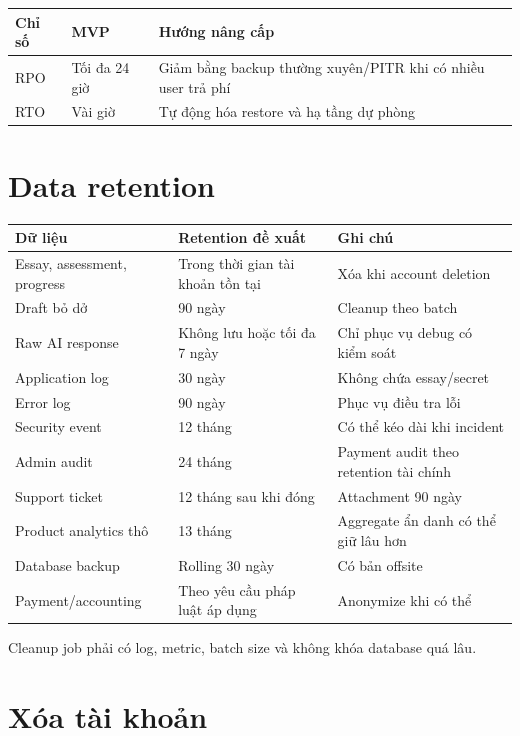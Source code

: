\documentclass[11pt,a4paper]{article}
\begin{document}
\begin{longtable}{L{0.22\textwidth}L{0.25\textwidth}L{0.45\textwidth}}
\toprule
\textbf{Chỉ số} & \textbf{MVP} & \textbf{Hướng nâng cấp} \\
\midrule
RPO & Tối đa 24 giờ & Giảm bằng backup thường xuyên/PITR khi có nhiều user trả phí \\
RTO & Vài giờ & Tự động hóa restore và hạ tầng dự phòng \\
\bottomrule
\end{longtable}

\section{Data retention}

\begin{longtable}{L{0.43\textwidth}L{0.24\textwidth}L{0.25\textwidth}}
\toprule
\textbf{Dữ liệu} & \textbf{Retention đề xuất} & \textbf{Ghi chú} \\
\midrule
Essay, assessment, progress & Trong thời gian tài khoản tồn tại & Xóa khi account deletion \\
Draft bỏ dở & 90 ngày & Cleanup theo batch \\
Raw AI response & Không lưu hoặc tối đa 7 ngày & Chỉ phục vụ debug có kiểm soát \\
Application log & 30 ngày & Không chứa essay/secret \\
Error log & 90 ngày & Phục vụ điều tra lỗi \\
Security event & 12 tháng & Có thể kéo dài khi incident \\
Admin audit & 24 tháng & Payment audit theo retention tài chính \\
Support ticket & 12 tháng sau khi đóng & Attachment 90 ngày \\
Product analytics thô & 13 tháng & Aggregate ẩn danh có thể giữ lâu hơn \\
Database backup & Rolling 30 ngày & Có bản offsite \\
Payment/accounting & Theo yêu cầu pháp luật áp dụng & Anonymize khi có thể \\
\bottomrule
\end{longtable}

Cleanup job phải có log, metric, batch size và không khóa database quá lâu.

\section{Xóa tài khoản}
\end{document}
